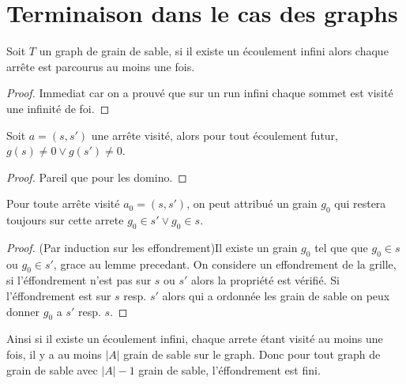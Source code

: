 \section{Terminaison dans le cas des graphs}
\begin{lem}
Soit $T$ un graph de grain de sable, si il existe un écoulement infini alors chaque arrête est parcourus au moins une fois.
\end{lem}

\begin{proof}
Immediat car on a prouvé que sur un run infini chaque sommet est visité une infinité de foi.
\end{proof}

\begin{lem}
Soit $a = (s,s')$ une arrête visité, alors pour tout écoulement futur, $g(s) \neq 0 \vee g(s') \neq 0$.
\end{lem}

\begin{proof}
Pareil que pour les domino.
\end{proof}

\begin{lem}
Pour toute arrête visité $a_0=(s,s')$, on peut attribué un grain $g_0$ qui restera toujours sur cette arrete $g_0 \in s' \vee g_0 \in s$.
\end{lem}
\begin{proof}
(Par induction sur les effondrement)Il existe un grain $g_0$ tel que que $g_0 \in s$ ou $g_0 \in s'$, grace au lemme precedant.
On considere un effondrement de la grille, si l'éffondrement n'est pas sur $s$ ou $s'$ alors la propriété est vérifié.
Si l'éffondrement est sur $s$ resp. $s'$ alors qui a ordonnée les grain de sable on peux donner $g_0$ a $s'$ resp. $s$.
\end{proof}

Ainsi si il existe un écoulement infini, chaque arrete étant visité au moins une fois, il y a au moins $|A|$ grain de sable sur le graph.
Donc pour tout graph de grain de sable avec $|A|-1$ grain de sable, l'éffondrement est fini.
